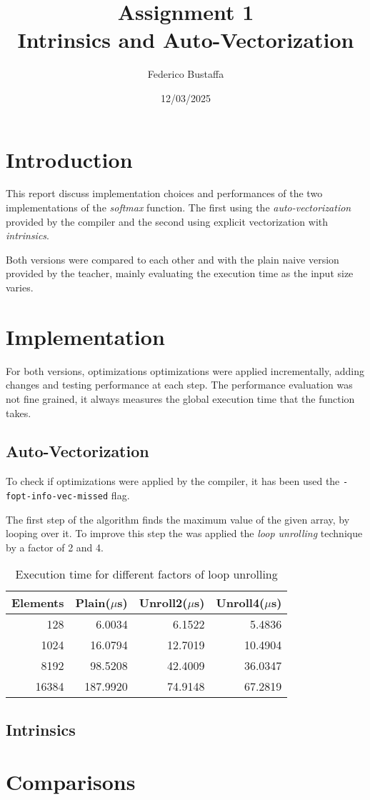 \documentclass[12pt, a4paper]{article}
\title{Assignment 1\\Intrinsics and Auto-Vectorization}
\author{Federico Bustaffa}
\date{12/03/2025}
\begin{document}
\maketitle
\tableofcontents

\section{Introduction}

This report discuss implementation choices and performances of the two
implementations of the \textit{softmax} function. The first using the
\textit{auto-vectorization} provided by the compiler and the second using
explicit vectorization with \textit{intrinsics}.

Both versions were compared to each other and with the plain naive version
provided by the teacher, mainly evaluating the execution time as the input size
varies.

\section{Implementation}

For both versions, optimizations optimizations were applied incrementally,
adding changes and testing performance at each step. The performance evaluation
was not fine grained, it always measures the global execution time that the
function takes.

\subsection{Auto-Vectorization}

To check if optimizations were applied by the compiler, it has been used the
\verb|-fopt-info-vec-missed| flag.

The first step of the algorithm finds the maximum value of the given array, by
looping over it. To improve this step the was applied the \textit{loop unrolling}
technique by a factor of 2 and 4.

\begin{table}[H]
	\centering
	\begin{tabular}{rrrr}
		\toprule
		Elements & Plain($\mu$s) & Unroll2($\mu$s) & Unroll4($\mu$s) \\
		\midrule
		128      & 6.0034        & 6.1522          & 5.4836          \\
		1024     & 16.0794       & 12.7019         & 10.4904         \\
		8192     & 98.5208       & 42.4009         & 36.0347         \\
		16384    & 187.9920      & 74.9148         & 67.2819         \\
		\bottomrule
	\end{tabular}
	\caption{Execution time for different factors of loop unrolling}
\end{table}

\subsection{Intrinsics}

\section{Comparisons}
\end{document}
